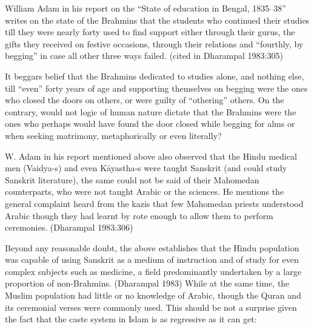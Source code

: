 William Adam in his report on the “State of education in Bengal, 1835–38” writes on the state of the Brahmins that the students who continued their studies till they were nearly forty used to find support either through their gurus, the gifts they received on festive occasions, through their relations and “fourthly, by begging” in case all other three ways failed. (cited in Dharampal 1983:305)

It beggars belief that the Brahmins dedicated to studies alone, and nothing else, till “even” forty years of age and supporting themselves on begging were the ones who closed the doors on others, or were guilty of “othering” others. On the contrary, would not logic of human nature dictate that the Brahmins were the ones who perhaps would have found the door closed while begging for alms or when seeking matrimony, metaphorically or even literally?

W. Adam in his report mentioned above also observed that the Hindu medical men (Vaidya-s) and even Kāyastha-s were taught Sanskrit (and could study Sanskrit literature), the same could not be said of their Mahomedan counterparts, who were not taught Arabic or the sciences. He mentions the general complaint heard from the kazis that few Mahomedan priests understood Arabic though they had learnt by rote enough to allow them to perform ceremonies. (Dharampal 1983:306)

Beyond any reasonable doubt, the above establishes that the Hindu population was capable of using Sanskrit as a medium of instruction and of study for even complex subjects such as medicine, a field predominantly undertaken by a large proportion of non-Brahmins. (Dharampal 1983) While at the same time, the Muslim population had little or no knowledge of Arabic, though the Quran and its ceremonial verses were commonly used. This should be not a surprise given the fact that the caste system in Islam is as regressive as it can get:

\newpage

